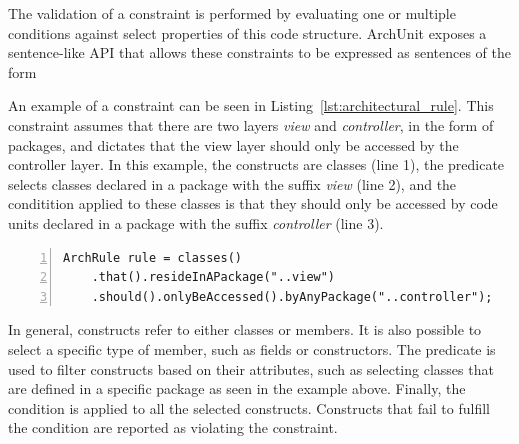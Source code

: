 The validation of a constraint is performed by evaluating one or multiple conditions against select properties of this code structure. ArchUnit exposes a sentence-like API that allows these constraints to be expressed as sentences of the form  

An example of a constraint can be seen in Listing~\ref{lst:architectural_rule}. This constraint assumes that there are two layers \textit{view} and \textit{controller}, in the form of packages, and dictates that the view layer should only be accessed by the controller layer. In this example, the constructs are classes (line 1), the predicate selects classes declared in a package with the suffix \textit{view} (line 2), and the conditition applied to these classes is that they should only be accessed by code units declared in a package with the suffix \textit{controller} (line 3).

\begin{center}
\begin{minipage}{0.90\linewidth}
\begin{lstlisting}[caption={Example of an architectural rule in ArchUnit.}, captionpos=b, label=lst:architectural_rule, numbers=left]
ArchRule rule = classes()
    .that().resideInAPackage("..view")
    .should().onlyBeAccessed().byAnyPackage("..controller");
\end{lstlisting}
\end{minipage}
\end{center}

In general, constructs refer to either classes or members. It is also possible to select a specific type of member, such as fields or constructors. The predicate is used to filter constructs based on their attributes, such as selecting classes that are defined in a specific package as seen in the example above. Finally, the condition is applied to all the selected constructs. Constructs that fail to fulfill the condition are reported as violating the constraint.





